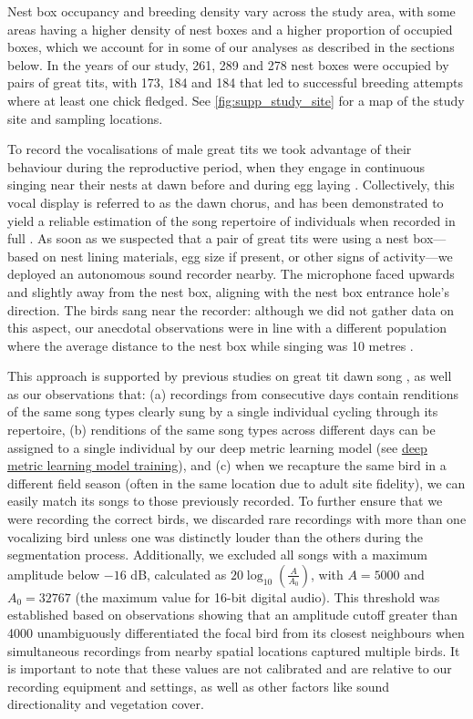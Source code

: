 \documentclass[9pt, onecolumn, twoside, lineno]{gsajnl}
\begin{document}
Nest box occupancy and breeding density vary across the study area, with some areas having a higher density of nest boxes and a higher proportion of occupied boxes, which we account for in some of our analyses as described in the sections below. In the years of our study,  261, 289 and 278 nest boxes were occupied by pairs of great tits, with 173, 184 and 184 that led to successful breeding attempts where at least one chick fledged. See \autoref{fig:supp_study_site} for a map of the study site and sampling locations.

To record the vocalisations of male great tits we took advantage of their behaviour during the reproductive period, when they engage in continuous singing near their nests at dawn before and during egg laying \autocite{mace1987}. Collectively, this vocal display is referred to as the dawn chorus, and has been demonstrated to yield a reliable estimation of the song repertoire of individuals when recorded in full \autocite{rivera-gutierrez2012, vanduyse2005}. As soon as we suspected that a pair of great tits were using a nest box---based on nest lining materials, egg size if present, or other signs of activity---we deployed an autonomous sound recorder nearby. The microphone faced upwards and slightly away from the nest box, aligning with the nest box entrance hole's direction. The birds sang near the recorder: although we did not gather data on this aspect, our anecdotal observations were in line with a different population where the average distance to the nest box while singing was 10 metres \autocite{halfwerk2012}. 

This approach is supported by previous studies on great tit dawn song \autocite{keen2020, naguib2019,snijders2015, boucaud2016, boucaud2016a}, as well as our observations that: (a) recordings from consecutive days contain renditions of the same song types clearly sung by a single individual cycling through its repertoire, (b) renditions of the same song types across different days can be assigned to a single individual by our deep metric learning model (see \hyperref[sc:song-similarity]{deep metric learning model training}), and (c) when we recapture the same bird in a different field season (often in the same location due to adult site fidelity), we can easily match its songs to those previously recorded. To further ensure that we were recording the correct birds, we discarded rare recordings with more than one vocalizing bird unless one was distinctly louder than the others during the segmentation process. Additionally, we excluded all songs with a maximum amplitude below $-16$ dB, calculated as $20\log_{10}\left(\frac{A}{A_0}\right)$, with $A=5000$ and $A_0=32767$ (the maximum value for 16-bit digital audio). This threshold was established based on observations showing that an amplitude cutoff greater than 4000 unambiguously differentiated the focal bird from its closest neighbours when simultaneous recordings from nearby spatial locations captured multiple birds. It is important to note that these values are not calibrated and are relative to our recording equipment and settings, as well as other factors like sound directionality and vegetation cover.
\end{document}
